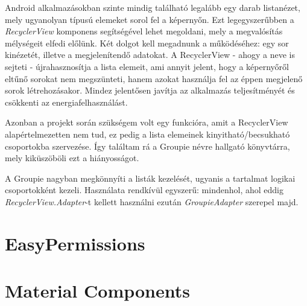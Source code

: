 Android alkalmazásokban szinte mindig található legalább egy darab listanézet, mely ugyanolyan típusú elemeket sorol fel a képernyőn. Ezt legegyszerűbben a \emph{RecyclerView} komponens segítségével lehet megoldani, mely a megvalósítás mélységeit elfedi előlünk. Két dolgot kell megadnunk a működéséhez: egy sor kinézetét, illetve a megjelenítendő adatokat. A RecyclerView - ahogy a neve is sejteti - újrahasznosítja a lista elemeit, ami annyit jelent, hogy a képernyőről eltűnő sorokat nem megszünteti, hanem azokat használja fel az éppen megjelenő sorok létrehozásakor. Mindez jelentősen javítja az alkalmazás teljesítményét és csökkenti az energiafelhasználást. \cite{RecyclerView}

Azonban a projekt során szükségem volt egy funkcióra, amit a RecyclerView alapértelmezetten nem tud, ez pedig a lista elemeinek kinyitható/becsukható csoportokba szervezése. Így találtam rá a Groupie névre hallgató könyvtárra, mely kiküszöböli ezt a hiányosságot. 

A Groupie nagyban megkönnyíti a listák kezelését, ugyanis a tartalmat logikai csoportokként kezeli. Használata rendkívül egyszerű: mindenhol, ahol eddig \emph{RecyclerView.Adapter}-t kellett használni ezután \emph{GroupieAdapter} szerepel majd.

\section{EasyPermissions}

\section{Material Components}